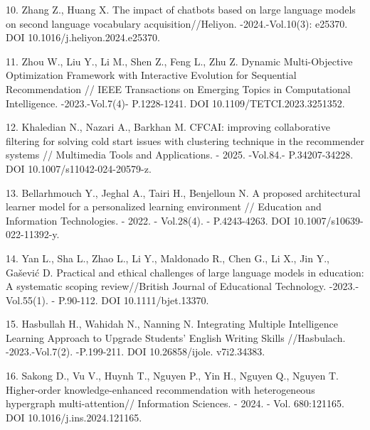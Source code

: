 \begin{refs}
10. Zhang Z., Huang X. The impact of chatbots based on large language
models on second language vocabulary acquisition//Heliyon.
-2024.-Vol.10(3): e25370. DOI 10.1016/j.heliyon.2024.e25370.

11. Zhou W., Liu Y., Li M., Shen Z., Feng L., Zhu Z. Dynamic
Multi-Objective Optimization Framework with Interactive Evolution for
Sequential Recommendation // IEEE Transactions on Emerging Topics in
Computational Intelligence. -2023.-Vol.7(4)- P.1228-1241. DOI
10.1109/TETCI.2023.3251352.

12. Khaledian N., Nazari A., Barkhan M. CFCAI: improving collaborative
filtering for solving cold start issues with clustering technique in the
recommender systems // Multimedia Tools and Applications. -
2025. -Vol.84.- P.34207-34228. DOI 10.1007/s11042-024-20579-z.

13. Bellarhmouch Y., Jeghal A., Tairi H., Benjelloun N. A proposed
architectural learner model for a personalized learning environment //
Education and Information Technologies. - 2022. - Vol.28(4). -
P.4243-4263. DOI 10.1007/s10639-022-11392-y.

14. Yan L., Sha L., Zhao L., Li Y., Maldonado R., Chen G., Li X., Jin
Y., Gašević D. Practical and ethical challenges of large language models
in education: A systematic scoping review//British Journal of
Educational Technology. -2023.-Vol.55(1). - P.90-112. DOI
10.1111/bjet.13370.

15. Hasbullah H., Wahidah N., Nanning N. Integrating Multiple
Intelligence Learning Approach to Upgrade Students'{}
English Writing Skills //Hasbulach. -2023.-Vol.7(2). -P.199-211. DOI
10.26858/ijole. v7i2.34383.

16. Sakong D., Vu V., Huynh T., Nguyen P., Yin H., Nguyen Q., Nguyen T.
Higher-order knowledge-enhanced recommendation with heterogeneous
hypergraph multi-attention// Information Sciences. - 2024. - Vol.
680:121165. DOI 10.1016/j.ins.2024.121165.
\end{refs}

